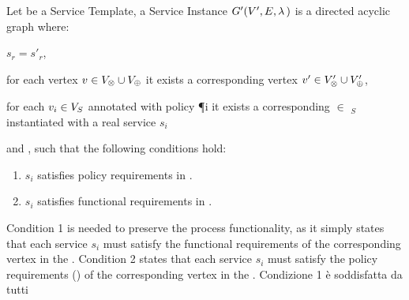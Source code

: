   \begin{definition}\label{def:instance}
    Let \tChartFunction be a Service Template, a Service Instance $G'(V',E,\lambda\,)$ is a directed acyclic graph where:
    \begin{enumerate*}[label=\roman*)]
      \item $s_r=s'_r$,
      \item for each vertex $v_{}\in V_{\otimes}\cup V_{\oplus}$ it exists a corresponding vertex $v'_{}\in V'_{\otimes}\cup V'_{\oplus}$,
      \item for each $v_{i}\in V_S$ annotated with policy \P{i} it exists a corresponding $\in$ \Vp$_S$ instantiated with a real service $s_i$
    \end{enumerate*}
    and , such that the following conditions hold:
    \begin{enumerate}[label=\arabic*)]
      \item $s_i$ satisfies policy requirements in \tChartFunction.
      \item $s_i$ satisfies functional requirements  in \tChartFunction.
    \end{enumerate}
  \end{definition}

  Condition 1 is needed to preserve the process functionality, as it simply states that each service $s_i$ must satisfy the functional requirements of the corresponding vertex in the \pipelineTemplate.
  Condition 2 states that each service $s_i$ must satisfy the policy requirements \myLambda() of the corresponding vertex  in the \pipelineTemplate.
  Condizione 1 è soddisfatta da tutti


